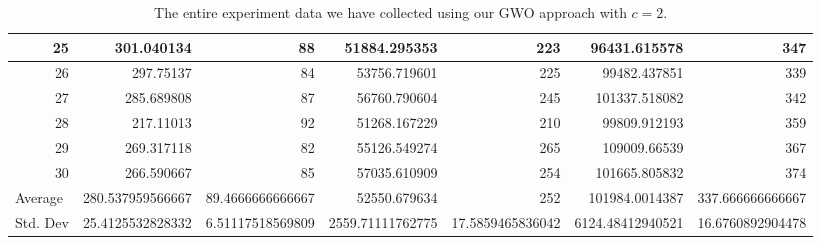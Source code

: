 \begin{table}
\begin{adjustwidth}{}{}
{{\begin{tabular}{|r|r|r|r|r|r|r|}
\hline
25                                         & 301.040134                   & 88                                    & 51884.295353                   & 223                                   & 96431.615578                 & 347                                    \\ 
\hline
26                                         & 297.75137                    & 84                                    & 53756.719601                   & 225                                   & 99482.437851                 & 339                                    \\ 
\hline
27                                         & 285.689808                   & 87                                    & 56760.790604                   & 245                                   & 101337.518082                & 342                                    \\ 
\hline
28                                         & 217.11013                    & 92                                    & 51268.167229                   & 210                                   & 99809.912193                 & 359                                    \\ 
\hline
29                                         & 269.317118                   & 82                                    & 55126.549274                   & 265                                   & 109009.66539                 & 367                                    \\ 
\hline
30                                         & 266.590667                   & 85                                    & 57035.610909                   & 254                                   & 101665.805832                & 374                                    \\ 
\hline
\multicolumn{1}{|l|}{Average}              & 280.537959566667             & 89.4666666666667                      & 52550.679634                   & 252                                   & 101984.0014387               & 337.666666666667                       \\ 
\hline
\multicolumn{1}{|l|}{Std. Dev}             & 25.4125532828332             & 6.51117518569809                      & 2559.71111762775               & 17.5859465836042                      & 6124.48412940521             & 16.6760892904478                       \\
\hline
\end{tabular}}}
\end{adjustwidth}
\caption{The entire experiment data we have collected using our GWO approach with $c = 2$.}
\label{full-data-gwo-c2}
\end{table}

